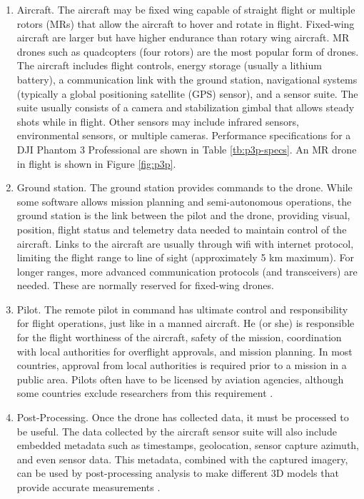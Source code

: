\begin{enumerate}
\item Aircraft. The aircraft may be fixed wing capable of straight flight or multiple rotors (MRs) that allow the aircraft to hover and rotate in flight. Fixed-wing aircraft are larger but have higher endurance than rotary wing aircraft. MR drones such as quadcopters (four rotors) are the most popular form of drones. The aircraft includes flight controls, energy storage (usually a lithium battery), a communication link with the ground station, navigational systems (typically a global positioning satellite (GPS) sensor), and a sensor suite. The suite usually consists of a camera and stabilization gimbal that allows steady shots while in flight. Other sensors may include infrared sensors, environmental sensors, or multiple cameras. Performance specifications for a DJI Phantom 3 Professional are shown in Table \ref{tb:p3p-specs}. An MR drone in flight is shown in Figure \ref{fig:p3p}.

\item Ground station. The ground station provides commands to the drone. While some software allows mission planning and semi-autonomous operations, the ground station is the link between the pilot and the drone, providing visual, position, flight status and telemetry data needed to maintain control of the aircraft. Links to the aircraft are usually through wifi with internet protocol, limiting the flight range to line of sight (approximately 5 km maximum). For longer ranges, more advanced communication protocols (and transceivers) are needed. These are normally reserved for fixed-wing drones.

\item Pilot. The remote pilot in command has ultimate control and responsibility for flight operations, just like in a manned aircraft. He (or she) is responsible for the flight worthiness of the aircraft, safety of the mission, coordination with local authorities for overflight approvals, and mission planning. In most countries, approval from local authorities is required prior to a mission in a public area. Pilots often have to be licensed by aviation agencies, although some countries exclude researchers from this requirement \citep{UAVCoach2017}.

\item Post-Processing. Once the drone has collected data, it must be processed to be useful. The data collected by the aircraft sensor suite will also include embedded metadata such as timestamps, geolocation, sensor capture azimuth, and even sensor data. This metadata, combined with the captured imagery, can be used by post-processing analysis to make different 3D models that provide accurate measurements \citep{Sona2014}. 

\end{enumerate}

